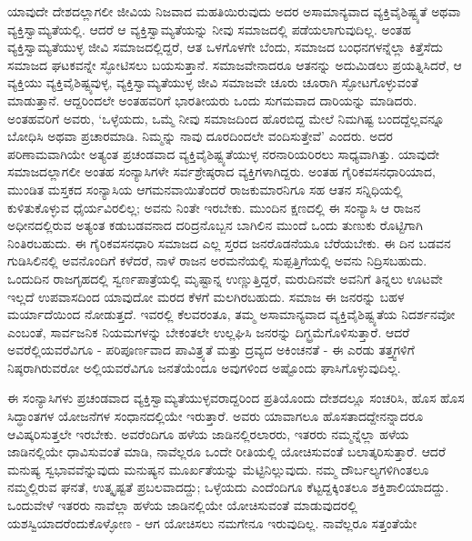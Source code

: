 ಯಾವುದೇ ದೇಶದಲ್ಲಾಗಲೀ ಜೀವಿಯ ನಿಜವಾದ ಮಹತಿಯಿರುವುದು ಅದರ ಅಸಾಮಾನ್ಯವಾದ ವ್ಯಕ್ತಿವೈಶಿಷ್ಟ್ಯತೆ ಅಥವಾ ವ್ಯಕ್ತಿಸ್ವಾಮ್ಯತೆಯಲ್ಲಿ. ಆದರೆ ಆ ವ್ಯಕ್ತಿಸ್ವಾಮ್ಯತೆಯನ್ನು ನೀವು ಸಮಾಜದಲ್ಲಿ ಪಡೆಯಲಾಗುವುದಿಲ್ಲ. ಅಂತಹ ವ್ಯಕ್ತಿಸ್ವಾಮ್ಯತೆಯುಳ್ಳ ಜೀವಿ ಸಮಾಜದಲ್ಲಿದ್ದರೆ, ಆತ ಒಳಗೊಳಗೇ ಬೆಂದು, ಸಮಾಜದ ಬಂಧನಗಳನ್ನೆಲ್ಲಾ ಕಿತ್ತೆಸೆದು ಸಮಾಜದ ಘಟಕವನ್ನೇ ಸ್ಫೋಟಿಸಲು ಬಯಸುತ್ತಾನೆ. ಸಮಾಜವೇನಾದರೂ ಆತನನ್ನು ಅದುಮಿಡಲು ಪ್ರಯತ್ನಿಸಿದರೆ, ಆ ವ್ಯಕ್ತಿಯು ವ್ಯಕ್ತಿವೈಶಿಷ್ಟ್ಯವುಳ್ಳ, ವ್ಯಕ್ತಿಸ್ವಾಮ್ಯತೆಯುಳ್ಳ ಜೀವಿ ಸಮಾಜವೇ ಚೂರು ಚೂರಾಗಿ ಸ್ಫೋಟಗೊಳ್ಳುವಂತೆ ಮಾಡುತ್ತಾನೆ. ಆದ್ದರಿಂದಲೇ ಅಂತಹವರಿಗೆ ಭಾರತೀಯರು ಒಂದು ಸುಗಮವಾದ ದಾರಿಯನ್ನು ಮಾಡಿದರು. ಅಂತಹವರಿಗೆ ಅವರು, ‘ಒಳ್ಳೆಯದು, ಒಮ್ಮೆ ನೀವು ಸಮಾಜದಿಂದ ಹೊರಬಿದ್ದ ಮೇಲೆ ನಿಮಗಿಷ್ಟ ಬಂದದ್ದೆಲ್ಲವನ್ನೂ ಬೋಧಿಸಿ ಅಥವಾ ಪ್ರಚಾರಮಾಡಿ. ನಿಮ್ಮನ್ನು ನಾವು ದೂರದಿಂದಲೇ ವಂದಿಸುತ್ತೇವೆ’ ಎಂದರು. ಅದರ ಪರಿಣಾಮವಾಗಿಯೇ ಅತ್ಯಂತ ಪ್ರಚಂಡವಾದ ವ್ಯಕ್ತಿವೈಶಿಷ್ಟ್ಯತೆಯುಳ್ಳ ನರನಾರಿಯರಿರಲು ಸಾಧ್ಯವಾಗಿತ್ತು. ಯಾವುದೇ ಸಮಾಜದಲ್ಲಾಗಲೀ ಅಂತಹ ಸಂನ್ಯಾಸಿಗಳೇ ಸರ್ವಶ್ರೇಷ್ಠರಾದ ವ್ಯಕ್ತಿಗಳಾಗಿದ್ದರು. ಅಂತಹ ಗೈರಿಕವಸನಧಾರಿಯಾದ, ಮುಂಡಿತ ಮಸ್ತಕದ ಸಂನ್ಯಾಸಿಯ ಆಗಮನವಾಯಿತೆಂದರೆ ರಾಜಕುಮಾರನಿಗೂ ಸಹ ಆತನ ಸನ್ನಿಧಿಯಲ್ಲಿ ಕುಳಿತುಕೊಳ್ಳುವ ಧೈರ್ಯವಿರಲಿಲ್ಲ; ಅವನು ನಿಂತೇ ಇರಬೇಕು. ಮುಂದಿನ ಕ್ಷಣದಲ್ಲಿ ಈ ಸಂನ್ಯಾಸಿ ಆ ರಾಜನ ಅಧೀನದಲ್ಲಿರುವ ಅತ್ಯಂತ ಕಡುಬಡವನಾದ ದರಿದ್ರನೊಬ್ಬನ ಬಾಗಿಲಿನ ಮುಂದೆ ಒಂದು ತುಣುಕು ರೊಟ್ಟಿಗಾಗಿ ನಿಂತಿರಬಹುದು. ಈ ಗೈರಿಕವಸನಧಾರಿ ಸಮಾಜದ ಎಲ್ಲ ಸ್ತರದ ಜನರೊಡನೆಯೂ ಬೆರೆಯಬೇಕು. ಈ ದಿನ ಬಡವನ ಗುಡಿಸಿಲಿನಲ್ಲಿ ಅವನೊಂದಿಗೆ ಕಳೆದರೆ, ನಾಳೆ ರಾಜನ ಅರಮನೆಯಲ್ಲಿ ಸುಪ್ಪತ್ತಿಗೆಯಲ್ಲಿ ಅವನು ನಿದ್ರಿಸಬಹುದು. ಒಂದುದಿನ ರಾಜಗೃಹದಲ್ಲಿ ಸ್ವರ್ಣಪಾತ್ರೆಯಲ್ಲಿ ಮೃಷ್ಟಾನ್ನ ಉಣ್ಣುತ್ತಿದ್ದರೆ, ಮರುದಿನವೇ ಅವನಿಗೆ ತಿನ್ನಲು ಊಟವೇ ಇಲ್ಲದೆ ಉಪವಾಸದಿಂದ ಯಾವುದೋ ಮರದ ಕೆಳಗೆ ಮಲಗಿರಬಹುದು. ಸಮಾಜ ಈ ಜನರನ್ನು ಬಹಳ ಮರ್ಯಾದೆಯಿಂದ ನೋಡುತ್ತದೆ. ಇವರಲ್ಲಿ ಕೆಲವರಂತೂ, ತಮ್ಮ ಅಸಾಮಾನ್ಯವಾದ ವ್ಯಕ್ತಿವೈಶಿಷ್ಟ್ಯತೆಯ ನಿದರ್ಶನವೋ ಎಂಬಂತೆ, ಸಾರ್ವಜನಿಕ ನಿಯಮಗಳನ್ನು ಬೇಕಂತಲೇ ಉಲ್ಲಘಿಸಿ ಜನರನ್ನು ದಿಗ್ಭ್ರಮೆಗೊಳಿಸುತ್ತಾರೆ. ಆದರೆ ಅವರೆಲ್ಲಿಯವರೆವಿಗೂ - ಪರಿಪೂರ್ಣವಾದ ಪಾವಿತ್ರ್ಯತೆ ಮತ್ತು ದ್ರವ್ಯದ ಅಕಿಂಚನತೆ - ಈ ಎರಡು ತತ್ತ್ವಗಳಿಗೆ ನಿಷ್ಠರಾಗಿರುವರೋ ಅಲ್ಲಿಯವರೆವಿಗೂ ಜನತೆಯೆಂದೂ ಅವುಗಳಿಂದ ಅಷ್ಟೊಂದು ಘಾಸಿಗೊಳ್ಳುವುದಿಲ್ಲ.

ಈ ಸಂನ್ಯಾಸಿಗಳು ಪ್ರಚಂಡವಾದ ವ್ಯಕ್ತಿಸ್ವಾಮ್ಯತೆಯುಳ್ಳವರಾದ್ದರಿಂದ ಪ್ರತಿಯೊಂದು ದೇಶದಲ್ಲೂ ಸಂಚರಿಸಿ, ಹೊಸ ಹೊಸ ಸಿದ್ಧಾಂತಗಳ ಯೋಜನೆಗಳ ಸಂಧಾನದಲ್ಲಿಯೇ ಇರುತ್ತಾರೆ. ಅವರು ಯಾವಾಗಲೂ ಹೊಸತಾದದ್ದೇನನ್ನಾದರೂ ಆವಿಷ್ಕರಿಸುತ್ತಲೇ ಇರಬೇಕು. ಅವರೆಂದಿಗೂ ಹಳೆಯ ಜಾಡಿನಲ್ಲಿರಲಾರರು, ಇತರರು ನಮ್ಮನ್ನೆಲ್ಲಾ ಹಳೆಯ ಜಾಡಿನಲ್ಲಿಯೇ ಧಾವಿಸುವಂತೆ ಮಾಡಿ, ನಾವೆಲ್ಲರೂ ಒಂದೇ ರೀತಿಯಲ್ಲಿ ಯೋಚಿಸುವಂತೆ ಬಲಾತ್ಕರಿಸುತ್ತಾರೆ. ಆದರೆ ಮನುಷ್ಯ ಸ್ವಭಾವವೆನ್ನುವುದು ಮನುಷ್ಯನ ಮೂರ್ಖತೆಯನ್ನು ಮೆಟ್ಟಿನಿಲ್ಲುವುದು. ನಮ್ಮ ದೌರ್ಬಲ್ಯಗಳಿಗಿಂತಲೂ ನಮ್ಮಲ್ಲಿರುವ ಘನತೆ, ಉತ್ಕೃಷ್ಟತೆ ಪ್ರಬಲವಾದದ್ದು; ಒಳ್ಳೆಯದು ಎಂದೆಂದಿಗೂ ಕೆಟ್ಟದ್ದಕ್ಕಿಂತಲೂ ಶಕ್ತಿಶಾಲಿಯಾದದ್ದು. ಒಂದುವೇಳೆ ಇತರರು ನಾವೆಲ್ಲಾ ಹಳೆಯ ಜಾಡಿನಲ್ಲಿಯೇ ಯೋಚಿಸುವಂತೆ ಮಾಡುವುದರಲ್ಲಿ ಯಶಸ್ವಿಯಾದರೆಂದುಕೊಳ್ಳೋಣ - ಆಗ ಯೋಚಿಸಲು ನಮಗೇನೂ ಇರುವುದಿಲ್ಲ. ನಾವೆಲ್ಲರೂ ಸತ್ತಂತೆಯೇ

